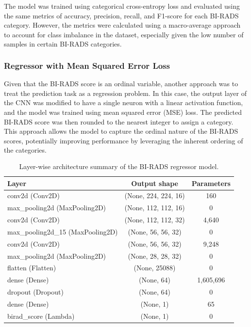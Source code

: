 \documentclass[12pt]{article}
\begin{document}
\medskip \noindent
The model was trained using categorical cross-entropy loss and evaluated using the same metrics of accuracy, precision, recall, and F1-score for each BI-RADS category. However, the metrics were calculated using a macro-average approach to account for class imbalance in the dataset, especially given the low number of samples in certain BI-RADS categories.


\subsubsection{Regressor with Mean Squared Error Loss}
Given that the BI-RADS score is an ordinal variable, another approach was to treat the prediction task as a regression problem. In this case, the output layer of the CNN was modified to have a single neuron with a linear activation function, and the model was trained using mean squared error (MSE) loss. The predicted BI-RADS score was then rounded to the nearest integer to assign a category. This approach allows the model to capture the ordinal nature of the BI-RADS scores, potentially improving performance by leveraging the inherent ordering of the categories.

\begin{table}[!htbp]
    \centering
    \begin{tabular}{lcc}
        \toprule
        Layer & Output shape & Parameters \\
        \midrule
        conv2d (Conv2D) & (None, 224, 224, 16) & 160 \\
        max\_pooling2d (MaxPooling2D) & (None, 112, 112, 16) & 0 \\
        conv2d (Conv2D) & (None, 112, 112, 32) & 4,640 \\
        max\_pooling2d\_15 (MaxPooling2D) & (None, 56, 56, 32) & 0 \\
        conv2d (Conv2D) & (None, 56, 56, 32) & 9,248 \\
        max\_pooling2d (MaxPooling2D) & (None, 28, 28, 32) & 0 \\
        flatten (Flatten) & (None, 25088) & 0 \\
        dense (Dense) & (None, 64) & 1,605,696 \\
        dropout (Dropout) & (None, 64) & 0 \\
        dense (Dense) & (None, 1) & 65 \\
        birad\_score (Lambda) & (None, 1) & 0 \\
        \bottomrule
    \end{tabular}
    \caption{Layer-wise architecture summary of the BI-RADS regressor model.}
    \label{tab:biradsregressor}
\end{table}
\end{document}
